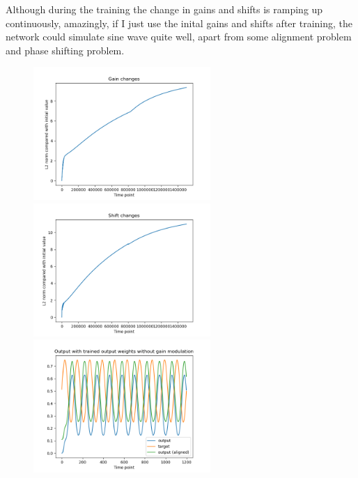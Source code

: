 \documentclass[12pt, a4paper]{article}
\begin{document}
Although during the training the change in gains and shifts is ramping up continuously, amazingly, if I just use the inital gains and shifts after training, the network could simulate sine wave quite well, apart from some alignment problem and phase shifting problem.

\begin{figure}[H]
    \centering
    \includegraphics[width=0.6\textwidth]{RNN/FORCE/fig/FORCE_fbtargethebb_theogc.png} \\
    \includegraphics[width=0.6\textwidth]{RNN/FORCE/fig/FORCE_fbtargethebb_theosc.png} \\
    \includegraphics[width=0.6\textwidth]{RNN/FORCE/fig/FORCE_fbtargethebb_nogainoutput.png} \\
\end{figure}
\end{document}
